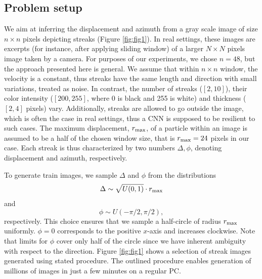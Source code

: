 \documentclass{svjour3}                     %
\begin{document}
\subsection{Problem setup}

We aim at inferring the displacement and azimuth from a gray scale image of size $n \times n$ pixels depicting streaks (Figure \ref{fig:fig1}). In real settings, these images are excerpts (for instance, after applying sliding window) of a larger $N \times N$ pixels image taken by a camera. For purposes of our experiments, we chose $n = 48$, but the approach presented here is general. We assume that within $n \times n$ window, the velocity is a constant, thus streaks have the same length and direction with small variations, treated as noise. In contrast, the number of streaks ($[2, 10]$), their color intensity ($[200, 255]$, where 0 is black and 255 is white) and thickness ($[2, 4]$ pixels) vary. Additionally, streaks are allowed to go outside the image, which is often the case in real settings, thus a CNN is supposed to be resilient to such cases. The maximum displacement, $r_\textnormal{max}$, of a particle within an image is assumed to be a half of the chosen window size, that is $r_\textnormal{max} = 24$ pixels in our case. Each streak is thus characterized by two numbers $\Delta, \phi$, denoting displacement and azimuth, respectively. 

To generate train images, we sample $\Delta$ and $\phi$ from the distributions
\begin{equation}
\Delta \sim \sqrt{U(0, 1)} \cdot r_\textnormal{max}
\end{equation}
and
\begin{equation}
\phi \sim U(-\pi/2, \pi/2),
\end{equation}
respectively. This choice ensures that we sample a half-circle of radius $r_\textnormal{max}$ uniformly. $\phi = 0$ corresponds to the positive $x$-axis and increases clockwise. Note that limits for $\phi$ cover only half of the circle since we have inherent ambiguity with respect to the direction. Figure \ref{fig:fig1} shows a selection of streak images generated using stated procedure. The outlined procedure enables generation of millions of images in just a few minutes on a regular PC. 
\end{document}
